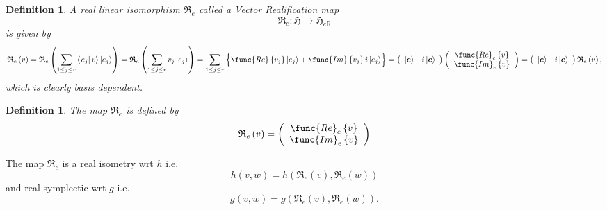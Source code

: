 \documentclass[aps,preprint]{revtex4}
\newtheorem{definition}[theorem]{Definition}
\begin{document}
\begin{definition}
A \emph{real linear isomorphism }$\mathfrak{R}_{e}$ called a \emph{Vector
Realification} map 
\begin{equation}
\mathfrak{R}_{e}:\mathfrak{H\rightarrow H}_{e\mathbb{R}}
\end{equation}%
is given by 
\begin{equation}
\mathfrak{R}_{e}\left( v\right) =\mathfrak{R}_{e}\left( \sum_{1\leq j\leq
r}\left\langle \left. e_{j}\right\vert v\right\rangle \left\vert
e_{j}\right\rangle \right) =\mathfrak{R}_{e}\left( \sum_{1\leq j\leq
r}v_{j}\left\vert e_{j}\right\rangle \right) =\sum_{1\leq j\leq r}\left\{ 
\overset{}{\func{Re}\left\{ v_{j}\right\} \left\vert e_{j}\right\rangle +%
\func{Im}\left\{ v_{j}\right\} i\left\vert e_{j}\right\rangle }\right\}
=\left( 
\begin{array}{cc}
\left\vert \boldsymbol{e}\right\rangle & i\left\vert \boldsymbol{e}%
\right\rangle%
\end{array}%
\right) \left( 
\begin{array}{c}
\func{Re}_{e}\left\{ v\right\} \\ 
\func{Im}_{e}\left\{ v\right\}%
\end{array}%
\right) =\left( 
\begin{array}{cc}
\left\vert \boldsymbol{e}\right\rangle & i\left\vert \boldsymbol{e}%
\right\rangle%
\end{array}%
\right) \mathfrak{R}_{e}\left( v\right) ,
\end{equation}%
which is clearly basis dependent.
\end{definition}

\begin{definition}
The map $\mathfrak{R}_{e}$ is defined by 
\begin{equation}
\mathfrak{R}_{e}\left( v\right) =\left( 
\begin{array}{c}
\func{Re}_{e}\left\{ v\right\} \\ 
\func{Im}_{e}\left\{ v\right\}%
\end{array}%
\right)
\end{equation}
\end{definition}

The map $\mathfrak{R}_{e}$ is a real isometry wrt $h$ i.e. 
\begin{equation}
h\left( v,w\right) =h\left( \mathfrak{R}_{e}\left( v\right) ,\mathfrak{R}%
_{e}\left( w\right) \right)
\end{equation}%
and real symplectic wrt $g$ i.e. 
\begin{equation}
g\left( v,w\right) =g\left( \mathfrak{R}_{e}\left( v\right) ,\mathfrak{R}%
_{e}\left( w\right) \right) .
\end{equation}
\end{document}
